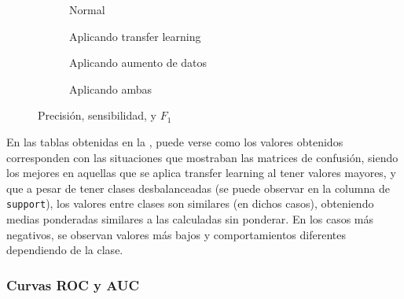 				\begin{figure}[!h]
					\centering
					\scriptsize
					\begin{subfigure}{.5\textwidth}
						\centering
						
						\caption{Normal}
						\label{fig:m_conv}
					\end{subfigure}\hfill
					\begin{subfigure}{.5\textwidth}
						\centering
						
						\caption{Aplicando transfer learning}
						\label{fig:m_mb}
					\end{subfigure}
					\begin{subfigure}{.5\textwidth}
						\centering
						
						\caption{Aplicando aumento de datos}
						\label{fig:m_convau}
					\end{subfigure}\hfill
					\begin{subfigure}{.5\textwidth}
						\centering
						
						\caption{Aplicando ambas}
						\label{fig:m_mbau}
					\end{subfigure}
					\caption{Precisión, sensibilidad, y $F_1$}
					\label{fig:m}
				\end{figure}
				
				En las tablas obtenidas en la , puede verse como los valores obtenidos corresponden con las situaciones que mostraban las matrices de confusión, siendo los mejores en aquellas que se aplica transfer learning al tener valores mayores, y que a pesar de tener clases desbalanceadas (se puede observar en la columna de \texttt{support}), los valores entre clases son similares (en dichos casos), obteniendo medias ponderadas similares a las calculadas sin ponderar. En los casos más negativos, se observan valores más bajos y comportamientos diferentes dependiendo de la clase. 
			
			\subsubsection{Curvas ROC y AUC}
			
